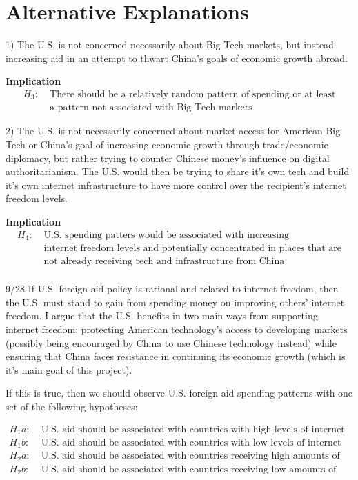 \section*{Alternative Explanations}
1) The U.S. is not concerned necessarily about Big Tech markets, but instead increasing aid in an attempt to thwart China's goals of economic growth abroad.

\textbf{Implication}
\begin{align*}
    H_3:\; & \text{There should be a relatively random pattern of spending or at least}\\
    & \text{a pattern not associated with Big Tech markets}
\end{align*}

2) The U.S. is not necessarily concerned about market access for American Big Tech or China's goal of increasing economic growth through trade/economic diplomacy, but rather trying to counter Chinese money's influence on digital authoritarianism. The U.S. would then be trying to share it's own tech and build it's own internet infrastructure to have more control over the recipient's internet freedom levels.

\textbf{Implication}
\begin{align*}
    H_4:\; & \text{U.S. spending patters would be associated with increasing}\\
    & \text{internet freedom levels and potentially concentrated in places that are}\\
    & \text{not already receiving tech and infrastructure from China}\\
\end{align*}

9/28
If U.S. foreign aid policy is rational and related to internet freedom, then the U.S. must stand to gain from spending money on improving others' internet freedom. I argue that the U.S. benefits in two main ways from supporting internet freedom: protecting American technology's access to developing markets (possibly being encouraged by China to use Chinese technology instead) while ensuring that China faces resistance in continuing its economic growth (which is it's main goal of this project).

If this is true, then we should observe U.S. foreign aid spending patterns with one set of the following hypotheses:

\begin{align*}
    H_1a:\; & \text{U.S. aid should be associated with countries with high levels of internet freedom.}\\
    H_1b:\; & \text{U.S. aid should be associated with countries with low levels of internet freedom.}\\
    H_2a:\; & \text{U.S. aid should be associated with countries receiving high amounts of Chinese aid.}\\
    H_2b:\; & \text{U.S. aid should be associated with countries receiving low amounts of Chinese aid.}
\end{align*}

